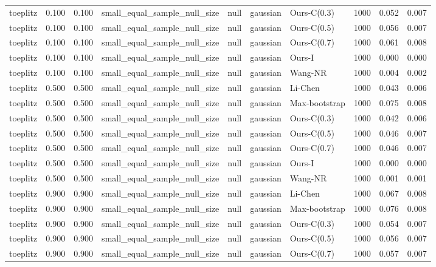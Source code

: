 \begin{tabular}{lrrllllrrr}
toeplitz & 0.100 & 0.100 & small\_equal\_sample\_null\_size & null & gaussian & Ours-C(0.3) & 1000 & 0.052 & 0.007 \\
toeplitz & 0.100 & 0.100 & small\_equal\_sample\_null\_size & null & gaussian & Ours-C(0.5) & 1000 & 0.056 & 0.007 \\
toeplitz & 0.100 & 0.100 & small\_equal\_sample\_null\_size & null & gaussian & Ours-C(0.7) & 1000 & 0.061 & 0.008 \\
toeplitz & 0.100 & 0.100 & small\_equal\_sample\_null\_size & null & gaussian & Ours-I & 1000 & 0.000 & 0.000 \\
toeplitz & 0.100 & 0.100 & small\_equal\_sample\_null\_size & null & gaussian & Wang-NR & 1000 & 0.004 & 0.002 \\
toeplitz & 0.500 & 0.500 & small\_equal\_sample\_null\_size & null & gaussian & Li-Chen & 1000 & 0.043 & 0.006 \\
toeplitz & 0.500 & 0.500 & small\_equal\_sample\_null\_size & null & gaussian & Max-bootstrap & 1000 & 0.075 & 0.008 \\
toeplitz & 0.500 & 0.500 & small\_equal\_sample\_null\_size & null & gaussian & Ours-C(0.3) & 1000 & 0.042 & 0.006 \\
toeplitz & 0.500 & 0.500 & small\_equal\_sample\_null\_size & null & gaussian & Ours-C(0.5) & 1000 & 0.046 & 0.007 \\
toeplitz & 0.500 & 0.500 & small\_equal\_sample\_null\_size & null & gaussian & Ours-C(0.7) & 1000 & 0.046 & 0.007 \\
toeplitz & 0.500 & 0.500 & small\_equal\_sample\_null\_size & null & gaussian & Ours-I & 1000 & 0.000 & 0.000 \\
toeplitz & 0.500 & 0.500 & small\_equal\_sample\_null\_size & null & gaussian & Wang-NR & 1000 & 0.001 & 0.001 \\
toeplitz & 0.900 & 0.900 & small\_equal\_sample\_null\_size & null & gaussian & Li-Chen & 1000 & 0.067 & 0.008 \\
toeplitz & 0.900 & 0.900 & small\_equal\_sample\_null\_size & null & gaussian & Max-bootstrap & 1000 & 0.076 & 0.008 \\
toeplitz & 0.900 & 0.900 & small\_equal\_sample\_null\_size & null & gaussian & Ours-C(0.3) & 1000 & 0.054 & 0.007 \\
toeplitz & 0.900 & 0.900 & small\_equal\_sample\_null\_size & null & gaussian & Ours-C(0.5) & 1000 & 0.056 & 0.007 \\
toeplitz & 0.900 & 0.900 & small\_equal\_sample\_null\_size & null & gaussian & Ours-C(0.7) & 1000 & 0.057 & 0.007 \\

\end{tabular}
